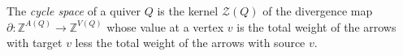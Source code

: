 \begin{definition}\label{Arden24-def-1.2}
\label{Arden24-def:cycle-space}
The \emph{cycle space} of a quiver $Q$ is the kernel $\mathcal{Z}(Q)$ of the divergence map $\partial \colon \mathbb{Z}^{A(Q)} \to \mathbb{Z}^{V(Q)}$ whose value at a vertex $v$ is the total weight of the arrows with target $v$ less the total weight of the arrows with source $v$.
\end{definition}